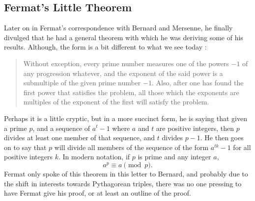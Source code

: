 \documentclass[11pt]{article}
\begin{document}
\subsection*{Fermat's Little Theorem}
Later on in Fermat's correspondence with Bernard and Mersenne, he finally divulged
that he had a general theorem with which he was deriving some of his results.
Although, the form is a bit different to what we see today \cite{Mahoney}: 
    \begin{quote}
        Without exception, every prime number measures one of the powers $- 1$    
        of any progression whatever, and the exponent of the said power is a
        submultiple of the given prime number $-1$.
        Also, after one has found the first power that satisfies the problem,
        all those which the exponents are multiples of the exponent of the first
        will satisfy the problem.
    \end{quote}
Perhaps it is a little cryptic, but in a more succinct form, he is saying that
given a prime $p$, and a sequence of $a^t - 1$ where $a$ and $t$ are positive
integers, then $p$ divides at least one member of that sequence, and $t$ divides
$p-1$.
He then goes on to say that $p$ will divide all members of the sequence of the
form $a^{tk} - 1$ for all positive integers $k$.
In modern notation, if $p$ is prime and any integer $a$,
\[a^p \equiv a \pmod{p}. \]
Fermat only spoke of this theorem in this letter to Bernard, and probably due to
the shift in interests towards Pythagorean triples, there was no one pressing
to have Fermat give his proof, or at least an outline of the proof.
\end{document}
